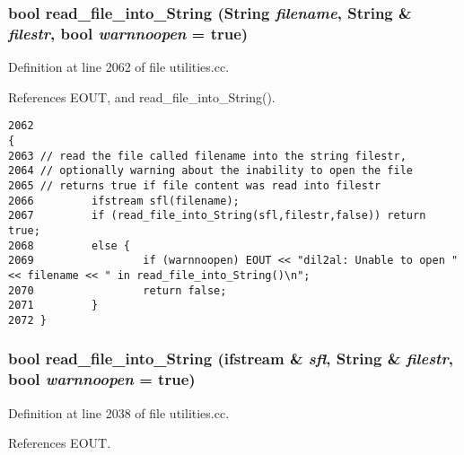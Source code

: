 \subsubsection{\setlength{\rightskip}{0pt plus 5cm}bool read\_\-file\_\-into\_\-String ({\bf String} {\em filename}, {\bf String} \& {\em filestr}, bool {\em warnnoopen} = {\bf true})}\label{utilities_8cc_a38}




Definition at line 2062 of file utilities.cc.

References EOUT, and read\_\-file\_\-into\_\-String().



\footnotesize\begin{verbatim}2062                                                                                       {
2063 // read the file called filename into the string filestr,
2064 // optionally warning about the inability to open the file
2065 // returns true if file content was read into filestr
2066         ifstream sfl(filename);
2067         if (read_file_into_String(sfl,filestr,false)) return true;
2068         else {
2069                 if (warnnoopen) EOUT << "dil2al: Unable to open " << filename << " in read_file_into_String()\n";
2070                 return false;
2071         }
2072 }
\end{verbatim}\normalsize 
{}
\subsubsection{\setlength{\rightskip}{0pt plus 5cm}bool read\_\-file\_\-into\_\-String (ifstream \& {\em sfl}, {\bf String} \& {\em filestr}, bool {\em warnnoopen} = {\bf true})}\label{utilities_8cc_a37}




Definition at line 2038 of file utilities.cc.

References EOUT.



